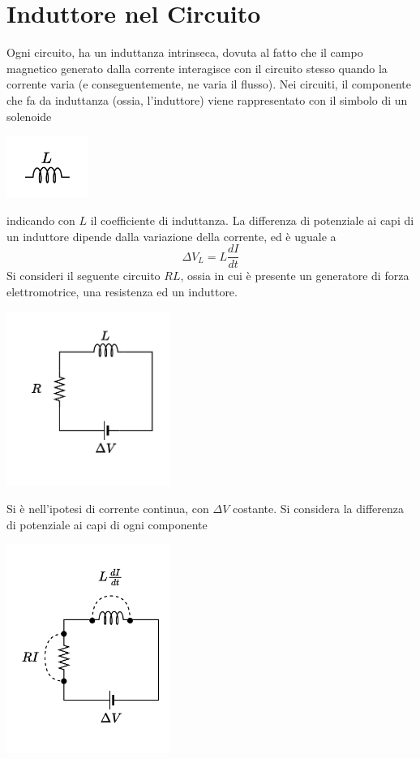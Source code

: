 \documentclass[10pt, letterpaper]{report}
\begin{document}
\section{Induttore nel Circuito}
Ogni circuito, ha un induttanza intrinseca, dovuta al fatto che il campo magnetico generato dalla corrente interagisce con il circuito stesso quando la corrente varia (e conseguentemente, ne varia il flusso). Nei circuiti, il componente che fa da induttanza (ossia, l'induttore) viene rappresentato con il simbolo di un solenoide\begin{center}
    \includegraphics[width=0.2\textwidth ]{images/induttanza.drawio.pdf}
\end{center}
indicando con $L$ il coefficiente di induttanza. La differenza di potenziale ai capi di un induttore dipende dalla variazione della corrente, ed è uguale a 
$$ \Delta V_L = L\dfrac{dI}{dt}$$
Si consideri il seguente circuito $RL$, ossia in cui è presente un generatore di forza elettromotrice, una resistenza ed un induttore.\begin{center}
    \includegraphics[width=0.4\textwidth ]{images/induttanza2.drawio.pdf}
\end{center}
Si è nell'ipotesi di corrente continua, con $\Delta V$ costante.
Si considera la differenza di potenziale ai capi di ogni componente \begin{center}
    \includegraphics[width=0.4\textwidth ]{images/induttanza3.drawio.pdf}
\end{center}
\end{document}
